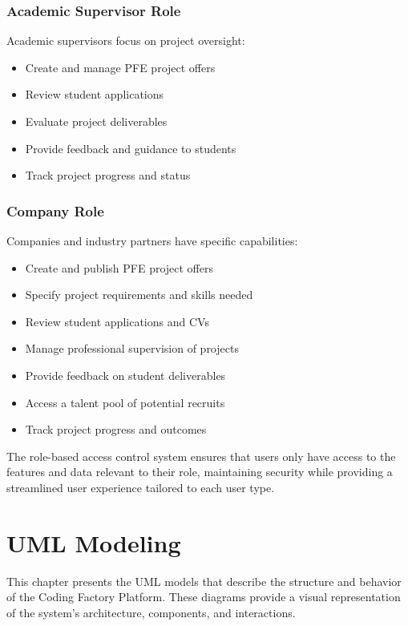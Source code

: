 \documentclass[12pt,a4paper]{report}
\begin{document}
\subsection{Academic Supervisor Role}
Academic supervisors focus on project oversight:

\begin{itemize}
    \item Create and manage PFE project offers
    \item Review student applications
    \item Evaluate project deliverables
    \item Provide feedback and guidance to students
    \item Track project progress and status
\end{itemize}

\subsection{Company Role}
Companies and industry partners have specific capabilities:

\begin{itemize}
    \item Create and publish PFE project offers
    \item Specify project requirements and skills needed
    \item Review student applications and CVs
    \item Manage professional supervision of projects
    \item Provide feedback on student deliverables
    \item Access a talent pool of potential recruits
    \item Track project progress and outcomes
\end{itemize}

The role-based access control system ensures that users only have access to the features and data relevant to their role, maintaining security while providing a streamlined user experience tailored to each user type.

\chapter{UML Modeling}

This chapter presents the UML models that describe the structure and behavior of the Coding Factory Platform. These diagrams provide a visual representation of the system's architecture, components, and interactions.
\end{document}
